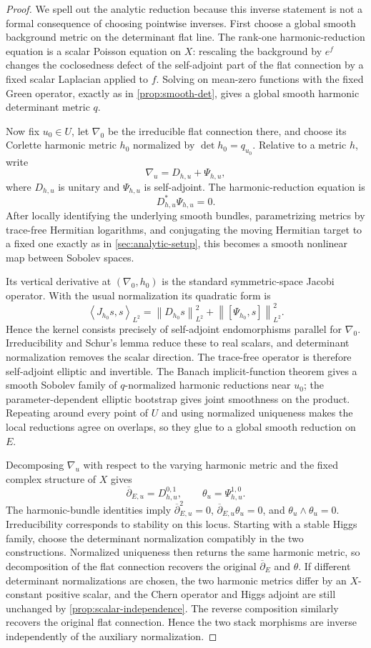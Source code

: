 \documentclass[11pt,reqno]{amsart}
\theoremstyle{definition}
\theoremstyle{remark}
\newcommand{\ddbar}{\overline\partial}
\newcommand{\ip}[2]{\left\langle #1,#2\right\rangle}
\newcommand{\norm}[1]{\left\lVert #1\right\rVert}
\begin{document}
\begin{proof}
We spell out the analytic reduction because this inverse statement is not a formal consequence of choosing pointwise inverses.  First choose a global smooth background metric on the determinant flat line.  The rank-one harmonic-reduction equation is a scalar Poisson equation on $X$: rescaling the background by $e^f$ changes the coclosedness defect of the self-adjoint part of the flat connection by a fixed scalar Laplacian applied to $f$.  Solving on mean-zero functions with the fixed Green operator, exactly as in \cref{prop:smooth-det}, gives a global smooth harmonic determinant metric $q$.

Now fix $u_0\in U$, let $\nabla_0$ be the irreducible flat connection there, and choose its Corlette harmonic metric $h_0$ normalized by $\det h_0=q_{u_0}$.  Relative to a metric $h$, write
\[
  \nabla_u=D_{h,u}+\Psi_{h,u},
\]
where $D_{h,u}$ is unitary and $\Psi_{h,u}$ is self-adjoint.  The harmonic-reduction equation is
\[
  D_{h,u}^{*}\Psi_{h,u}=0.
\]
After locally identifying the underlying smooth bundles, parametrizing metrics by trace-free Hermitian logarithms, and conjugating the moving Hermitian target to a fixed one exactly as in \cref{sec:analytic-setup}, this becomes a smooth nonlinear map between Sobolev spaces.

Its vertical derivative at $(\nabla_0,h_0)$ is the standard symmetric-space Jacobi operator.  With the usual normalization its quadratic form is
\[
  \ip{J_{h_0}s}{s}_{L^2}
  =\norm{D_{h_0}s}_{L^2}^2
   +\norm{[\Psi_{h_0},s]}_{L^2}^2.
\]
Hence the kernel consists precisely of self-adjoint endomorphisms parallel for $\nabla_0$.  Irreducibility and Schur's lemma reduce these to real scalars, and determinant normalization removes the scalar direction.  The trace-free operator is therefore self-adjoint elliptic and invertible.  The Banach implicit-function theorem gives a smooth Sobolev family of $q$-normalized harmonic reductions near $u_0$; the parameter-dependent elliptic bootstrap gives joint smoothness on the product.  Repeating around every point of $U$ and using normalized uniqueness makes the local reductions agree on overlaps, so they glue to a global smooth reduction on $E$.

Decomposing $\nabla_u$ with respect to the varying harmonic metric and the fixed complex structure of $X$ gives
\[
  \ddbar_{E,u}=D_{h,u}^{0,1},
  \qquad
  \theta_u=\Psi_{h,u}^{1,0}.
\]
The harmonic-bundle identities imply $\ddbar_{E,u}^2=0$,
$\ddbar_{E,u}\theta_u=0$, and $\theta_u\wedge\theta_u=0$.
Irreducibility corresponds to stability on this locus.  Starting with a
stable Higgs family, choose the determinant normalization compatibly in
the two constructions.  Normalized uniqueness then returns the same
harmonic metric, so decomposition of the flat connection recovers the
original $\ddbar_E$ and $\theta$.  If different determinant
normalizations are chosen, the two harmonic metrics differ by an
$X$-constant positive scalar, and the Chern operator and Higgs adjoint
are still unchanged by \cref{prop:scalar-independence}.  The reverse
composition similarly recovers the original flat connection.  Hence
the two stack morphisms are inverse independently of the auxiliary
normalization.
\end{proof}
\end{document}
